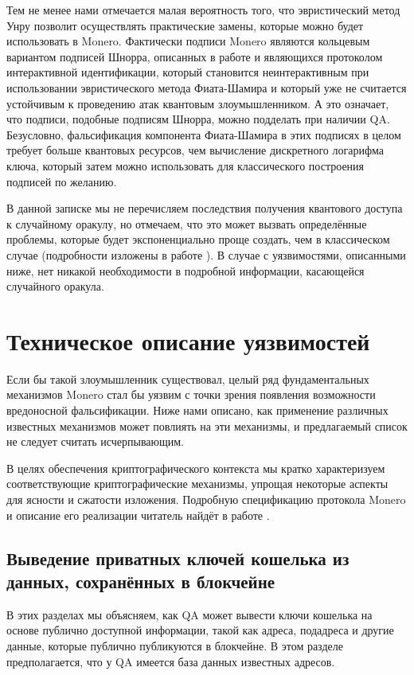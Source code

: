\documentclass{mrl}
\begin{document}
Тем не менее нами отмечается малая вероятность того, что эвристический метод Унру позволит осуществлять практические замены, которые можно будет использовать в Monero. Фактически подписи Monero являются кольцевым вариантом подписей Шнорра, описанных в работе \cite{schnorr1989efficient} и являющихся протоколом интерактивной идентификации, который становится неинтерактивным при использовании эвристического метода Фиата-Шамира и который уже не считается устойчивым к проведению атак квантовым злоумышленником. А это означает, что подписи, подобные подписям Шнорра, можно подделать при наличии QA. Безусловно, фальсификация компонента Фиата-Шамира в этих подписях в целом требует больше квантовых ресурсов, чем вычисление дискретного логарифма ключа, который затем можно использовать для классического построения подписей по желанию.

В данной записке мы не перечисляем последствия получения квантового доступа к случайному оракулу, но отмечаем, что это может вызвать определённые проблемы, которые будет экспоненциально проще создать, чем в классическом случае (подробности изложены в работе \cite{boneh2011random}). В случае с уязвимостями, описанными ниже, нет никакой необходимости в подробной информации, касающейся случайного оракула.


\section{Техническое описание уязвимостей}

Если бы такой злоумышленник существовал, целый ряд фундаментальных механизмов Monero стал бы уязвим с точки зрения появления возможности вредоносной фальсификации. Ниже нами описано, как применение различных известных механизмов может повлиять на эти механизмы, и предлагаемый список не следует считать исчерпывающим.

В целях обеспечения криптографического контекста мы кратко характеризуем соответствующие криптографические механизмы, упрощая некоторые аспекты для ясности и сжатости изложения. Подробную спецификацию протокола Monero и описание его реализации читатель найдёт в работе \cite{ztm2}. 

\subsection{Выведение приватных ключей кошелька из данных, сохранённых в блокчейне}\label{sec:keyext}

В этих разделах мы объясняем, как QA может вывести ключи кошелька на основе публично доступной информации, такой как адреса, подадреса и другие данные, которые публично публикуются в блокчейне. В этом разделе предполагается, что у QA имеется база данных известных адресов.
\end{document}
